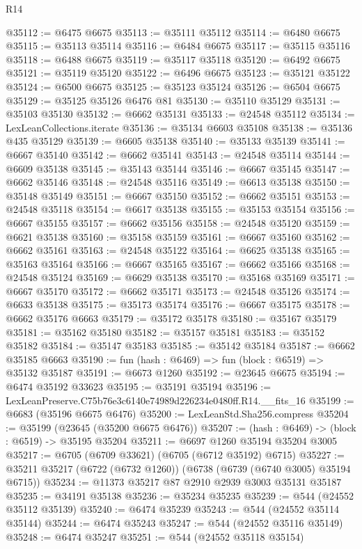 \begin{lexlean}{R14}
\begin{coremodule}
@35112 := @6475 @6675
@35113 := @35111 @35112
@35114 := @6480 @6675
@35115 := @35113 @35114
@35116 := @6484 @6675
@35117 := @35115 @35116
@35118 := @6488 @6675
@35119 := @35117 @35118
@35120 := @6492 @6675
@35121 := @35119 @35120
@35122 := @6496 @6675
@35123 := @35121 @35122
@35124 := @6500 @6675
@35125 := @35123 @35124
@35126 := @6504 @6675
@35129 := @35125 @35126 @6476 @81
@35130 := @35110 @35129
@35131 := @35103 @35130
@35132 := @6662 @35131
@35133 := @24548 @35112
@35134 := LexLeanCollections.iterate
@35136 := @35134 @6603 @35108
@35138 := @35136 @435 @35129
@35139 := @6605 @35138
@35140 := @35133 @35139
@35141 := @6667 @35140
@35142 := @6662 @35141
@35143 := @24548 @35114
@35144 := @6609 @35138
@35145 := @35143 @35144
@35146 := @6667 @35145
@35147 := @6662 @35146
@35148 := @24548 @35116
@35149 := @6613 @35138
@35150 := @35148 @35149
@35151 := @6667 @35150
@35152 := @6662 @35151
@35153 := @24548 @35118
@35154 := @6617 @35138
@35155 := @35153 @35154
@35156 := @6667 @35155
@35157 := @6662 @35156
@35158 := @24548 @35120
@35159 := @6621 @35138
@35160 := @35158 @35159
@35161 := @6667 @35160
@35162 := @6662 @35161
@35163 := @24548 @35122
@35164 := @6625 @35138
@35165 := @35163 @35164
@35166 := @6667 @35165
@35167 := @6662 @35166
@35168 := @24548 @35124
@35169 := @6629 @35138
@35170 := @35168 @35169
@35171 := @6667 @35170
@35172 := @6662 @35171
@35173 := @24548 @35126
@35174 := @6633 @35138
@35175 := @35173 @35174
@35176 := @6667 @35175
@35178 := @6662 @35176 @6663
@35179 := @35172 @35178
@35180 := @35167 @35179
@35181 := @35162 @35180
@35182 := @35157 @35181
@35183 := @35152 @35182
@35184 := @35147 @35183
@35185 := @35142 @35184
@35187 := @6662 @35185 @6663
@35190 := fun (hash : @6469) => fun (block : @6519) => @35132 @35187
@35191 := @6673 @1260
@35192 := @23645 @6675
@35194 := @6474 @35192 @33623
@35195 := @35191 @35194
@35196 := LexLeanPreserve.C75b76e3c6140e74989d226234e0480ff.R14.__fits_16
@35199 := @6683 (@35196 @6675 @6476)
@35200 := LexLeanStd.Sha256.compress
@35204 := @35199 (@23645 (@35200 @6675 @6476))
@35207 := (hash : @6469) -> (block : @6519) -> @35195 @35204
@35211 := @6697 @1260 @35194 @35204 @3005
@35217 := @6705 (@6709 @33621) (@6705 (@6712 @35192) @6715)
@35227 := @35211 @35217 (@6722 (@6732 @1260)) (@6738 (@6739 (@6740 @3005) @35194 @6715))
@35234 := @11373 @35217 @87 @2910 @2939 @3003 @35131 @35187
@35235 := @34191 @35138
@35236 := @35234 @35235
@35239 := @544 (@24552 @35112 @35139)
@35240 := @6474 @35239
@35243 := @544 (@24552 @35114 @35144)
@35244 := @6474 @35243
@35247 := @544 (@24552 @35116 @35149)
@35248 := @6474 @35247
@35251 := @544 (@24552 @35118 @35154)

\end{coremodule}
\end{lexlean}
